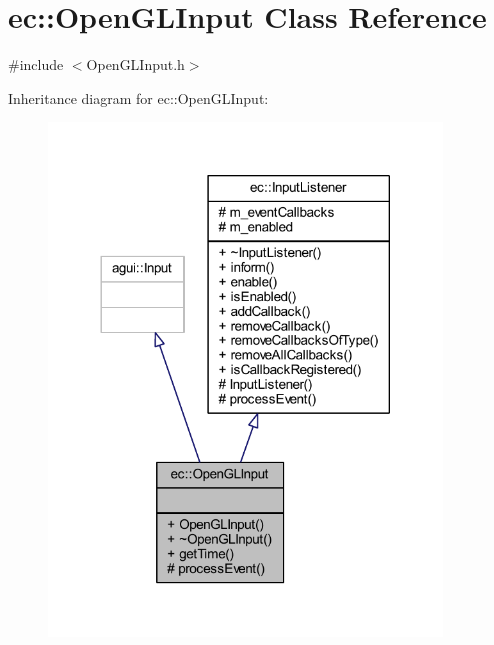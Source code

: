 \hypertarget{classec_1_1_open_g_l_input}{}\section{ec\+:\+:Open\+G\+L\+Input Class Reference}
\label{classec_1_1_open_g_l_input}


{\ttfamily \#include $<$Open\+G\+L\+Input.\+h$>$}



Inheritance diagram for ec\+:\+:Open\+G\+L\+Input\+:\nopagebreak
\begin{figure}[H]
\begin{center}
\leavevmode
\includegraphics[width=296pt]{classec_1_1_open_g_l_input__inherit__graph}
\end{center}
\end{figure}


